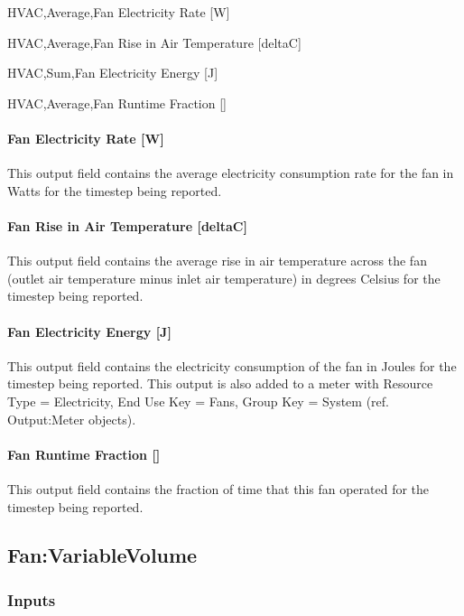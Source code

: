 HVAC,Average,Fan Electricity Rate {[}W{]}

HVAC,Average,Fan Rise in Air Temperature {[}deltaC{]}

HVAC,Sum,Fan Electricity Energy {[}J{]}

HVAC,Average,Fan Runtime Fraction {[]}

\paragraph{Fan Electricity Rate {[}W{]}}\label{fan-electric-power-w-1}

This output field contains the average electricity consumption rate for the fan in Watts for the timestep being reported.

\paragraph{Fan Rise in Air Temperature {[}deltaC{]}}\label{fan-rise-in-air-temperature-deltac-1}

This output field contains the average rise in air temperature across the fan (outlet air temperature minus inlet air temperature) in degrees Celsius for the timestep being reported.

\paragraph{Fan Electricity Energy {[}J{]}}\label{fan-electric-energy-j-1}

This output field contains the electricity consumption of the fan in Joules for the timestep being reported. This output is also added to a meter with Resource Type = Electricity, End Use Key = Fans, Group Key = System (ref. Output:Meter objects).

\paragraph{Fan Runtime Fraction {[]}}\label{fan-runtime-fraction}

This output field contains the fraction of time that this fan operated for the timestep being reported.

\subsection{Fan:VariableVolume}\label{fanvariablevolume}

\subsubsection{Inputs}\label{inputs-2-016}

